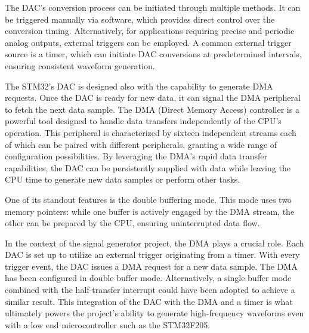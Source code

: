 \bigbreak

The DAC's conversion process can be initiated through multiple methods. It can be triggered manually via software, which provides direct control over the conversion timing. Alternatively, for applications requiring precise and periodic analog outputs, external triggers can be employed. A common external trigger source is a timer, which can initiate DAC conversions at predetermined intervals, ensuring consistent waveform generation.

\bigbreak

The STM32's DAC is designed also with the capability to generate DMA requests. Once the DAC is ready for new data, it can signal the DMA peripheral to fetch the next data sample. The DMA (Direct Memory Access) controller is a powerful tool designed to handle data transfers independently of the CPU's operation. This peripheral is characterized by sixteen independent streams each of which can be paired with different peripherals, granting a wide range of configuration possibilities. By leveraging the DMA's rapid data transfer capabilities, the DAC can be persistently supplied with data while leaving the CPU time to generate new data samples or perform other tasks.


One of its standout features is the double buffering mode. This mode uses two memory pointers: while one buffer is actively engaged by the DMA stream, the other can be prepared by the CPU, ensuring uninterrupted data flow.

\bigbreak

In the context of the signal generator project, the DMA plays a crucial role. Each DAC is set up to utilize an external trigger originating from a timer. With every trigger event, the DAC issues a DMA request for a new data sample. The DMA has been configured in double buffer mode. Alternatively, a single buffer mode combined with the half-transfer interrupt could have been adopted to achieve a similar result. This integration of the DAC with the DMA and a timer is what ultimately powers the project's ability to generate high-frequency waveforms even with a low end microcontroller such as the STM32F205.

\bigbreak

